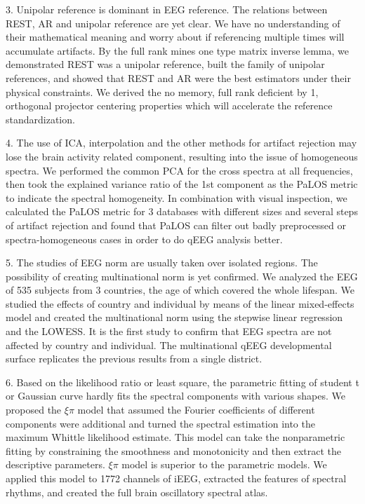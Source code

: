 \begin{englishabstract}
3. Unipolar reference is dominant in EEG reference. The relations between REST, AR and unipolar reference are yet clear. We have no understanding of their mathematical meaning and worry about if referencing multiple times will accumulate artifacts. By the
full rank mines one type matrix inverse lemma, we demonstrated REST was a unipolar reference, built the family of unipolar references, and showed that REST and AR were the best estimators under their physical constraints. We derived the no memory, full rank deficient by 1, orthogonal projector centering properties which will accelerate the reference standardization.

4. The use of ICA, interpolation and the other methods for artifact rejection may lose the brain activity related component, resulting into the issue of homogeneous spectra. We performed the common PCA for the cross spectra at all frequencies, then took the
explained variance ratio of the 1st component as the PaLOS metric to indicate the spectral homogeneity. In combination with visual inspection, we calculated the PaLOS metric for 3 databases with different sizes and several steps of artifact rejection and found that PaLOS can filter out badly preprocessed or spectra­-homogeneous cases in order to do qEEG analysis better.

5. The studies of EEG norm are usually taken over isolated regions. The possibility of creating multinational norm is yet confirmed. We analyzed the EEG of 535 subjects from 3 countries, the age of which covered the whole lifespan. We studied the effects of country and individual by means of the linear mixed-effects model and created the multinational norm using the stepwise linear regression and the LOWESS. It is the first study to confirm that EEG spectra are not affected by country and individual. The multinational qEEG developmental surface replicates the previous results from a single district.


6. Based on the likelihood ratio or least square, the parametric fitting of student t or Gaussian curve hardly fits the spectral components with various shapes. We proposed the $\xi\pi$ model that assumed the Fourier coefficients of different components were additional and turned the spectral estimation into the maximum Whittle likelihood estimate. This model can take the nonparametric fitting by constraining the smoothness and monotonicity and then extract the descriptive parameters. $\xi\pi$ model is superior to the parametric models. We applied this model to 1772 channels of iEEG, extracted the features of spectral rhythms, and created the full brain oscillatory spectral atlas.


\end{englishabstract}
